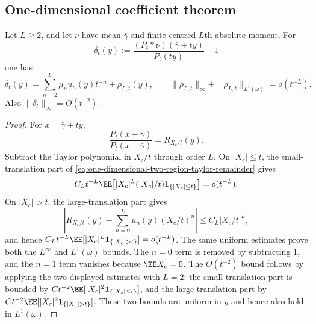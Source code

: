 \subsection{One-dimensional coefficient theorem}

\begin{lemma}%
\label{lem:exact-moment-density-truncation}
Let \(L\ge2\), and let \(\nu\) have mean \(\bar{\gamma}\) and finite centred
\(L\)th absolute moment.  For
\[
\delta_t(y):=
\frac{(P_t*\nu)(\bar{\gamma}+ty)}{P_t(ty)}-1
\]
one has
\begin{equation}\label{eq:exact-moment-density-truncation}
\delta_t(y)=\sum_{n=2}^{L}\mu_nu_n(y)t^{-n}+\rho_{L,t}(y),
\qquad
\|\rho_{L,t}\|_{\infty}+\|\rho_{L,t}\|_{L^1(\omega)}=o(t^{-L}).
\end{equation}
Also \(\|\delta_t\|_\infty=O(t^{-2})\).
\end{lemma}

\ifdefined\JFAArticleMain
{}
\else
\begin{proof}
For \(x=\bar{\gamma}+ty\),
\[
\frac{P_t(x-\gamma)}{P_t(x-\bar{\gamma})}
=R_{X_c/t}(y).
\]
Subtract the Taylor polynomial in \(X_c/t\) through order \(L\).  On
\(|X_c|\le t\), the small-translation part of
\eqref{eq:one-dimensional-two-region-taylor-remainder} gives
\[
C_Lt^{-L}\EE\!\left[|X_c|^L(|X_c|/t)\mathbf1_{\{|X_c|\le t\}}\right]
=o(t^{-L}).
\]
On \(|X_c|>t\), the large-translation part gives
\[
\left|R_{X_c/t}(y)-\sum_{n=0}^{L}u_n(y)(X_c/t)^n\right|
\le C_L|X_c/t|^L,
\]
and hence \(C_Lt^{-L}\EE[|X_c|^L\mathbf1_{\{|X_c|>t\}}]=o(t^{-L})\).  The same
uniform estimates prove both the \(L^\infty\) and \(L^1(\omega)\) bounds.  The
\(n=0\) term is removed by subtracting \(1\), and the \(n=1\) term vanishes
because \(\EE X_c=0\).  The \(O(t^{-2})\) bound follows by applying the two
displayed estimates with \(L=2\): the small-translation part is bounded by
\(Ct^{-2}\EE[|X_c|^2\mathbf1_{\{|X_c|\le t\}}]\), and the
large-translation part by
\(Ct^{-2}\EE[|X_c|^2\mathbf1_{\{|X_c|>t\}}]\).  These two bounds are
uniform in \(y\) and hence also hold in \(L^1(\omega)\).
\end{proof}
\fi

